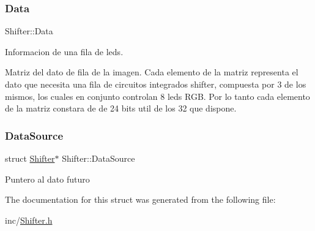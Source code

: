 \subsubsection{\texorpdfstring{Data}{Data}}
{\footnotesize\ttfamily Shifter\+::\+Data}



Informacion de una fila de leds. 

Matriz del dato de fila de la imagen. Cada elemento de la matriz representa el dato que necesita una fila de circuitos integrados shifter, compuesta por 3 de los mismos, los cuales en conjunto controlan 8 leds R\+GB. Por lo tanto cada elemento de la matriz constara de de 24 bits util de los 32 que dispone. \mbox{\label{struct_shifter_a7c2c0de3d2c63e31863ed44845d63ba8}} 
\subsubsection{\texorpdfstring{Data\+Source}{DataSource}}
{\footnotesize\ttfamily struct \mbox{\hyperlink{struct_shifter}{Shifter}}$\ast$ Shifter\+::\+Data\+Source}

Puntero al dato futuro 

The documentation for this struct was generated from the following file\+:\begin{DoxyCompactItemize}
\item 
inc/\mbox{\hyperlink{_shifter_8h}{Shifter.\+h}}\end{DoxyCompactItemize}
